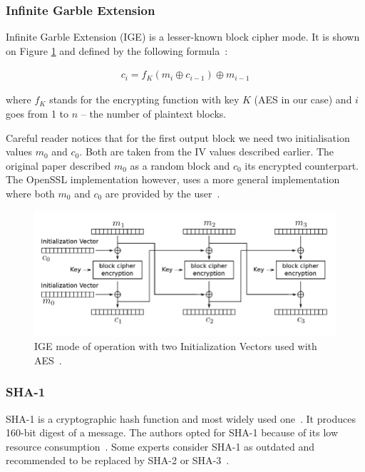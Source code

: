 \documentclass[thesis=M,english]{FITthesis}[2012/10/20]
\begin{document}
\subsubsection{Infinite Garble Extension}

Infinite Garble Extension (IGE) is a lesser-known block cipher mode. It is shown on Figure \ref{img:crypto-regular-ige-enc} and defined by the following formula~\cite{telegram-openssl-ige}:

\begin{gather*}
c_i = f_K(m_i \oplus c_{i-1}) \oplus m_{i-1}
\end{gather*}

where $f_K$ stands for the encrypting function with key $K$ (AES in our case) and $i$ goes from 1 to $n$ -- the number of plaintext blocks.

Careful reader notices that for the first output block we need two initialisation values $m_0$ and $c_0$. Both are taken from the IV values described earlier. The original paper described $m_0$ as a random block and $c_0$ its encrypted counterpart. The OpenSSL implementation however, uses a more general implementation where both $m_0$ and $c_0$ are provided by the user~\cite{telegram-openssl-ige}.

\begin{figure}[htb]
	\centering
	\includegraphics[width=1\textwidth]{ige-enc.pdf}
	\caption[IGE block cipher mode]{IGE mode of operation with two Initialization Vectors used with AES~\cite{telegram-aarhus}.}
	\label{img:crypto-regular-ige-enc}
\end{figure}

\subsubsection{SHA-1}

SHA-1 is a cryptographic hash function and most widely used one~\cite{understanding-crypto}. It produces 160-bit digest of a message. The authors opted for SHA-1 because of its low resource consumption~\cite{telegram-sha1}. Some experts consider SHA-1 as outdated and recommended to be replaced by SHA-2 or SHA-3~\cite{telegram-sha1}. %
\end{document}
